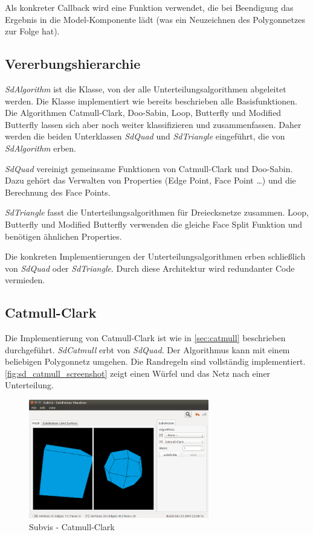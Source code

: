 Als konkreter Callback wird eine Funktion verwendet, die bei Beendigung das Ergebnis in die Model-Komponente lädt (was ein Neuzeichnen des Polygonnetzes zur Folge hat).

\subsection{Vererbungshierarchie}

\emph{SdAlgorithm} ist die Klasse, von der alle Unterteilungsalgorithmen abgeleitet werden.
Die Klasse implementiert wie bereits beschrieben alle Basisfunktionen.
Die Algorithmen Catmull-Clark, Doo-Sabin, Loop, Butterfly und Modified Butterfly lassen sich aber
noch weiter klassifizieren und zusammenfassen.
Daher werden die beiden Unterklassen \emph{SdQuad} und \emph{SdTriangle} eingeführt,
die von \emph{SdAlgorithm} erben.

\emph{SdQuad} vereinigt gemeinsame Funktionen von Catmull-Clark und Doo-Sabin.
Dazu gehört das Verwalten von Properties (Edge Point, Face Point \ldots) und
die Berechnung des Face Points.

\emph{SdTriangle} fasst die Unterteilungsalgorithmen für Dreiecksnetze zusammen.
Loop, Butterfly und Modified Butterfly verwenden die gleiche Face Split Funktion
und benötigen ähnlichen Properties.

Die konkreten Implementierungen der Unterteilungsalgorithmen erben schließlich
von \emph{SdQuad} oder \emph{SdTriangle}.
Durch diese Architektur wird redundanter Code vermieden.


\subsection{Catmull-Clark}

Die Implementierung von Catmull-Clark ist wie in \autoref{sec:catmull}
beschrieben durchgeführt. \emph{SdCatmull} erbt von \emph{SdQuad}.
Der Algorithmus kann mit einem beliebigen Polygonnetz umgehen.
Die Randregeln sind vollständig implementiert.
\autoref{fig:sd_catmull_screenshot} zeigt einen Würfel und das Netz nach
einer Unterteilung.

\begin{figure}
  \centering
  \includegraphics[width=0.7\textwidth]{content/media/sd_catmull_screenshot.png}
  \caption{Subvis - Catmull-Clark}
  \label{fig:sd_catmull_screenshot}
\end{figure}


